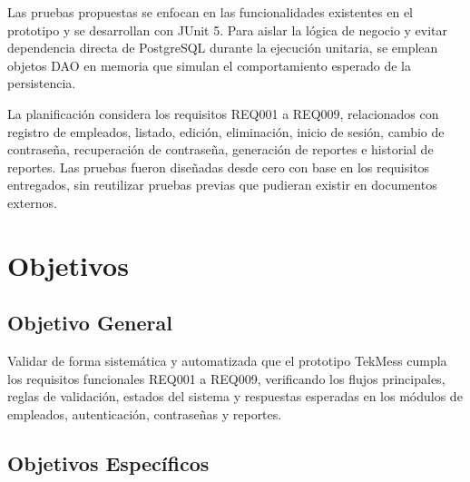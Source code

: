 \documentclass[12pt,a4paper]{article}
\begin{document}
Las pruebas propuestas se enfocan en las funcionalidades existentes en el prototipo y se desarrollan con JUnit 5. Para aislar la lógica de negocio y evitar dependencia directa de PostgreSQL durante la ejecución unitaria, se emplean objetos DAO en memoria que simulan el comportamiento esperado de la persistencia.

La planificación considera los requisitos REQ001 a REQ009, relacionados con registro de empleados, listado, edición, eliminación, inicio de sesión, cambio de contraseña, recuperación de contraseña, generación de reportes e historial de reportes. Las pruebas fueron diseñadas desde cero con base en los requisitos entregados, sin reutilizar pruebas previas que pudieran existir en documentos externos.

\section{Objetivos}

\subsection{Objetivo General}

Validar de forma sistemática y automatizada que el prototipo TekMess cumpla los requisitos funcionales REQ001 a REQ009, verificando los flujos principales, reglas de validación, estados del sistema y respuestas esperadas en los módulos de empleados, autenticación, contraseñas y reportes.

\subsection{Objetivos Específicos}
\end{document}
